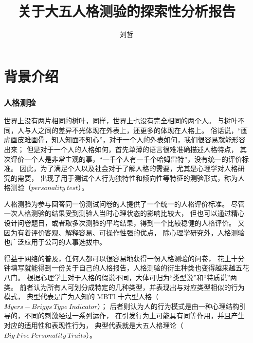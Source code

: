 \documentclass[UTF8]{ctexart}
\begin{document}
\title{关于大五人格测验的探索性分析报告}
\author{刘哲}
\maketitle
\part{背景介绍}
\section{人格测验}
世界上没有两片相同的树叶，同样，世界上也没有完全相同的两个人。
与树叶不同，人与人之间的差异不光体现在外表上，还更多的体现在人格上。
俗话说，“画虎画皮难画骨，知人知面不知心”，对于一个人的外表如何，我们很容易就能形容出来；
但是对于一个人的人格如何，首先单薄的语言很难准确描述人格特点，
其次评价一个人是非常主观的事，“一千个人有一千个哈姆雷特”，没有统一的评价标准。
因此，为了满足个人以及社会对于了解人格的需要，尤其是心理学对人格研究的需要，
出现了用于测试个人行为独特性和倾向性等特征的测验形式，称为人格测验（$personality\ test$）。\par
人格测验为参与回答同一份测试问卷的人提供了一个统一的人格评价标准。
尽管一次人格测验的结果受到测验人当时心理状态的影响比较大，
但也可以通过精心设计问卷题目，或者取多次测验的平均结果，得到一个比较稳健的人格评价。
又因为有着评价客观、解释容易、可操作性强的优点，
除心理学研究外，人格测验也广泛应用于公司的人事选拔中。\par
得益于网络的普及，任何人都可以很容易地获得一份人格测验的问卷，
花上十分钟填写就能得到一份关于自己的人格报告，人格测验的衍生种类也变得越来越五花八门。
根据心理学上对于人格的假说不同，大体可归为“类型说”和“特质说”两类。
前者认为所有人可划分成特定的几种类型，并表现出与对应类型相似的行为模式，
典型代表是广为人知的 MBTI 十六型人格（$Myers-Briggs\ Type\ Indicator$）；
后者则认为人的行为模式是由一种心理结构引导的，不同的刺激经过一系列运作，
在引发行为上可能具有同等作用，并且产生对应的适用性和表现性行为，
典型代表就是大五人格理论（$Big\ Five\ Personality\ Traits$）。
\end{document}
